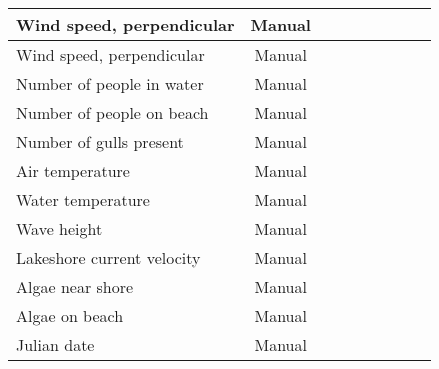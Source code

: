\begin{table}
{\begin{minipage}{\textwidth}
\begin{tabular}{ll|cccccccc}
        \multicolumn{2}{l|}{Wind speed, perpendicular} & Manual&&&&&&& \\
        \hline
        \multicolumn{2}{l|}{Wind speed, perpendicular} & Manual&&&&&&& \\
        \hline
        \multicolumn{2}{l|}{Number of people in water} & Manual&&&&&&& \\
        \hline
        \multicolumn{2}{l|}{Number of people on beach} & Manual&&&&&&& \\
        \hline
        \multicolumn{2}{l|}{Number of gulls present} & Manual&&&&&&& \\
        \hline
        \multicolumn{2}{l|}{Air temperature} & Manual&&&&&&& \\
        \hline
        \multicolumn{2}{l|}{Water temperature} & Manual&&&&&&& \\
        \hline
        \multicolumn{2}{l|}{Wave height} & Manual&&&&&&& \\
        \hline
        \multicolumn{2}{l|}{Lakeshore current velocity} & Manual&&&&&&& \\
        \hline
        \multicolumn{2}{l|}{Algae near shore} & Manual&&&&&&& \\
        \hline
        \multicolumn{2}{l|}{Algae on beach} & Manual&&&&&&& \\
        \hline
        \multicolumn{2}{l|}{Julian date} & Manual&&&&&&& \\
        \hline
        \end{tabular}
        \end{minipage}}
\end{table}
